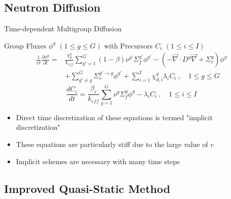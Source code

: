 \documentclass[8pt,xcolor=dvipnames]{beamer}
\renewcommand{\div}{\vec{\nabla}\! \cdot \!}
\newcommand{\grad}{\vec{\nabla}}
\newcommand{\be}{\begin{equation*}}
\newcommand{\ee}{\end{equation*}}
\newcommand{\keff}{\ensuremath{k_{\textit{eff}}}}
\begin{document}
\subsection{Neutron Diffusion}

\begin{frame}{Time-dependent Multigroup Diffusion}

\vspace{-3mm}

\begin{block}{Group Fluxes $\phi^g$ $(1 \le g \le G )$ with Precursors $C_i$ $(1 \le i \le I)$}
\begin{align*}
\frac{1}{v^g} \frac{\partial \phi^g }{\partial t} =& \frac{\chi_p^g}{\keff} \sum_{g'=1}^G (1-\beta) \nu^{g'} \Sigma_f^{g'} \phi^{g'} -  \left( -\div D^g \grad  + \Sigma_r^g \right) \phi^g  \nonumber \\
&  + \sum_{g'\neq g}^G\Sigma_s^{g'\to g} \phi^{g'}  + \sum_{i=1}^I\chi_{d,i}^g\lambda_i C_i \ , \quad 1 \le g \le G 
\end{align*}
\be
\frac{dC_i}{dt} = \frac{\beta_i}{k_{eff}}\sum_{g=1}^G\nu^{g} \Sigma_f^g \phi^{g} - \lambda_i C_i \ , \quad 1 \le i \le I 
\ee
\end{block}

\begin{block}{}
\begin{itemize}
\item Direct time discretization of these equations is termed "implicit discretization"
\item These equations are particularly stiff due to the large value of $v$
\item Implicit schemes are necessary with many time steps
\end{itemize}
\end{block}

\end{frame}

\subsection{Improved Quasi-Static Method}
\end{document}
